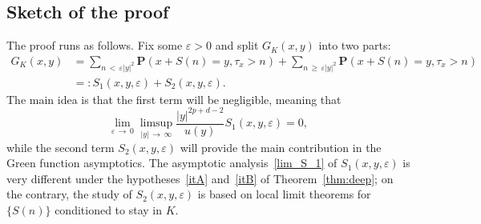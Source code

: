 \documentclass[AHL,Unicode,longabstracts,published]{cedram}
\newcommand{\pr}{\mathbf{P}}
\renewcommand{\ge}{\geqslant}
\begin{document}
\subsection*{Sketch of the proof}
The proof runs as follows. Fix some $\varepsilon>0$ and split $G_K(x,y)$ into two parts:
\begin{equation}\label{definition_S1_S2}
\begin{split}
G_K(x,y)&=\sum_{n\,<\,\varepsilon| y|^2}\pr\left(x+S(n)=y,\tau_x>n\right) +\sum_{n\,\ge\,\varepsilon | y|^2}\pr\left(x+S(n)=y,\tau_x>n\right)\\
&=:S_1(x,y,\varepsilon)+S_2(x,y,\varepsilon).
\end{split}
\end{equation}
The main idea is that the first term will be negligible, meaning that
\begin{equation}\label{lim_S_1}
\lim_{\varepsilon\,\to\,0}\limsup_{| y|\,\to\,\infty}\frac{| y|^{2p+d-2}}{u(y)}S_1(x,y,\varepsilon)=0,
\end{equation}
while the second term $S_2(x,y,\varepsilon)$ will provide the main contribution in the Green function asymptotics. The asymptotic analysis~\eqref{lim_S_1} of $S_1(x,y,\varepsilon)$ is very different under the hypotheses~\eqref{itA} and~\eqref{itB} of Theorem~\ref{thm:deep}; on the contrary, the study of $S_2(x,y,\varepsilon)$ is based on local limit theorems for $\{S(n)\}$ conditioned to stay in $K$.
\end{document}

